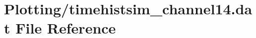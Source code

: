 \hypertarget{Plotting_2timehistsim__channel14_8dat}{}\section{Plotting/timehistsim\+\_\+channel14.dat File Reference}
\label{Plotting_2timehistsim__channel14_8dat}
